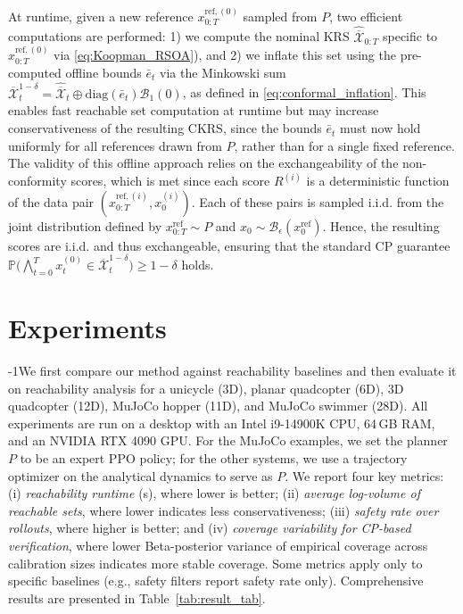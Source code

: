 \documentclass{l4dc2026}
\begin{document}
At runtime, given a new reference $x_{0:T}^{\text{ref}, (0)}$ sampled from $P$, two efficient computations are performed: 1) we compute the nominal KRS $\hat{\overline{\mathcal{X}}}_{0:T}$ specific to $x_{0:T}^{\text{ref}, (0)}$ via \eqref{eq:Koopman_RSOA}), and 2) we inflate this set using the pre-computed offline bounds $\bar e_t$ via the Minkowski sum $\overline{\mathcal{X}}_{t}^{1-\delta} = \hat{\overline{\mathcal{X}}}_{t} \oplus \textrm{diag}(\bar e_{t})\mathcal{B}_1(0)$, as defined in \eqref{eq:conformal_inflation}. This enables fast reachable set computation at runtime but may increase conservativeness of the resulting CKRS, since the bounds $\bar e_t$ must now hold uniformly for all references drawn from $P$, rather than for a single fixed reference. The validity of this offline approach relies on the exchangeability of the non-conformity scores, which is met since each score $R^{(i)}$ is a deterministic function of the data pair $(x_{0:T}^{\text{ref},(i)}, x_0^{(i)})$. Each of these pairs is sampled i.i.d. from the joint distribution defined by $x_{0:T}^{\text{ref}} \sim P$ and $x_0 \sim \mathcal{B}_\epsilon(x_{0}^{\text{ref}})$. Hence, the resulting scores are i.i.d. and thus exchangeable, ensuring that the standard CP guarantee $\mathbb{P}\big( \bigwedge_{t=0}^T x_t^{(0)} \in \overline{\mathcal{X}}_t^{1-\delta} \big) \ge 1-\delta$ holds.

\section{Experiments}
\label{sec:experiments}
\looseness-1We first compare our method against reachability baselines and then evaluate it on reachability analysis for a unicycle (3D), planar quadcopter (6D), 3D quadcopter (12D), MuJoCo \citep{todorov2012mujoco} hopper (11D), and MuJoCo swimmer (28D). All experiments are run on a desktop with an Intel i9-14900K CPU, 64\,GB RAM, and an NVIDIA RTX 4090 GPU. For the MuJoCo examples, we set the planner $P$ to be an expert PPO \citep{schulman2017proximalpolicyoptimizationalgorithms} policy; for the other systems, we use a trajectory optimizer on the analytical dynamics to serve as $P$. We report four key metrics: (i) \textit{reachability runtime} (s), where lower is better; (ii) \textit{average log-volume of reachable sets}, where lower indicates less conservativeness; (iii) \textit{safety rate over rollouts}, where higher is better; and (iv) \textit{coverage variability for CP-based verification}, where lower Beta-posterior variance of empirical coverage across calibration sizes indicates more stable coverage. Some metrics apply only to specific baselines (e.g., safety filters report safety rate only). Comprehensive results are presented in Table~\ref{tab:result_tab}.
\end{document}
